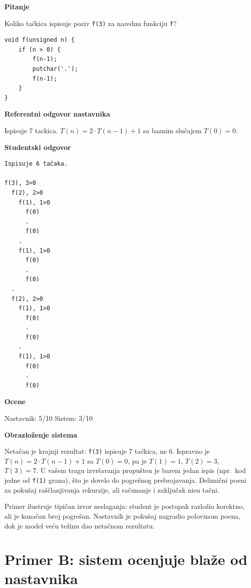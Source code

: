 \begin{tcolorbox}[promptbox]

\textbf{Pitanje}

Koliko tačkica ispisuje poziv \texttt{f(3)} za narednu funkciju \texttt{f}?

\begin{verbatim}
void f(unsigned n) {
    if (n > 0) {
        f(n-1);
        putchar('.');
        f(n-1);
    }
}
\end{verbatim}

\medskip
\textbf{Referentni odgovor nastavnika}
\nopagebreak

Ispisuje 7 tackica. $T(n) = 2 \cdot T(n-1) + 1$ sa baznim slučajem $T(0) = 0$.

\medskip
\begin{samepage}
\textbf{Studentski odgovor}

\begin{verbatim}
Ispisuje 6 tačaka.

f(3), 3>0
  f(2), 2>0
    f(1), 1>0
      f(0)
      .
      f(0)
    .
    f(1), 1>0
      f(0)
      .
      f(0)
  .
  f(2), 2>0
    f(1), 1>0
      f(0)
      .
      f(0)
    .
    f(1), 1>0
      f(0)
      .
      f(0)
\end{verbatim}
\end{samepage}

\medskip
\textbf{Ocene}
\nopagebreak

Nastavnik: 5/10 \hfill Sistem: 3/10

\medskip
\textbf{Obrazloženje sistema}
\nopagebreak

Netačan je krajnji rezultat: \texttt{f(3)} ispisuje 7 tačkica, ne 6.
Ispravno je $T(n) = 2 \cdot T(n-1) + 1$ sa $T(0) = 0$, pa je $T(1) = 1$, $T(2) = 3$, $T(3) = 7$.
U vašem tragu izvršavanja propušten je barem jedan ispis (npr.\ kod jedne od \texttt{f(1)} grana), što je dovelo do pogrešnog prebrojavanja.
Delimični poeni za pokušaj raščlanjivanja rekurzije, ali računanje i zaključak nisu tačni.

\end{tcolorbox}

Primer ilustruje tipičan izvor neslaganja: student je postupak razložio korektno, ali je konačan broj pogrešan.
Nastavnik je pokušaj nagradio polovinom poena, dok je model veću težinu dao netačnom rezultatu.

\section*{Primer B: sistem ocenjuje blaže od nastavnika}


